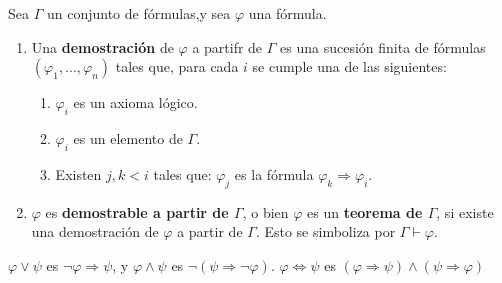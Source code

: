 \documentclass[12pt]{report}
\theoremstyle{largebreak}
\begin{document}
    \begin{mydef}
        Sea $\Gamma$ un conjunto de fórmulas,y sea $\varphi$ una fórmula.
        \begin{enumerate}
            \item Una \textbf{demostración} de $\varphi$ a partifr de $\Gamma$ es una sucesión finita de fórmulas $\left(\varphi_1,...,\varphi_n\right)$ tales que, para cada $i$ se cumple una de las siguientes:
            \begin{enumerate}
                \item $\varphi_i$ es un axioma lógico.
                \item $\varphi_i$ es un elemento de $\Gamma$.
                \item Existen $j,k<i$ tales que: $\varphi_j$ es la fórmula $\varphi_k\Rightarrow\varphi_i$.
            \end{enumerate}
            \item $\varphi$ es \textbf{demostrable a partir de $\Gamma$}, o bien $\varphi$ es un \textbf{teorema de $\Gamma$}, si existe una demostración de $\varphi$ a partir de $\Gamma$. Esto se simboliza por $\Gamma\vdash\varphi$. 
        \end{enumerate}
    \end{mydef}

    \begin{obs}
        $\varphi\lor\psi$ es $\neg\varphi\Rightarrow\psi$, y $\varphi\land\psi$ es $\neg(\psi\Rightarrow\neg \varphi)$.
        $\varphi\iff\psi$ es $(\varphi\Rightarrow \psi)\land( \psi\Rightarrow\varphi)$
    \end{obs}
\end{document}
